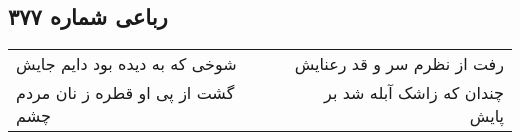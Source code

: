\begin{center}
\section*{رباعی شماره ۳۷۷}
\label{sec:sh377}
\begin{longtable}{l p{0.5cm} r}
شوخی که به دیده بود دایم جایش
&&
رفت از نظرم سر و قد رعنایش
\\
گشت از پی او قطره ز نان مردم چشم
&&
چندان که زاشک آبله شد بر پایش
\\
\end{longtable}
\end{center}
